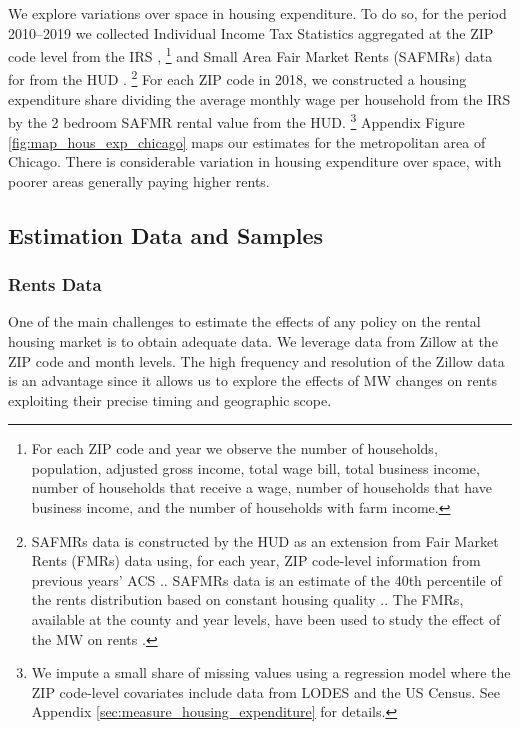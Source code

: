 We explore variations over space in housing expenditure.
To do so, for the period 2010--2019
we collected Individual Income Tax Statistics aggregated at the ZIP code level 
from the IRS \parencite{IRS},%
\footnote{For each ZIP code and year we observe the number of households, 
population, adjusted gross income, total wage bill, total business income, 
number of households that receive a wage, number of households that have 
business income, and the number of households with farm income.}
and Small Area Fair Market Rents (SAFMRs) data for from the HUD 
\parencite{hudSAFMR}.%
\footnote{SAFMRs data is constructed by the HUD as an extension from 
Fair Market Rents (FMRs) data using, for each year, ZIP code-level information
from previous years' ACS \parencite[][, p. 35]{SafmrReport2018}..
SAFMRs data is an estimate of the 40th percentile of the rents distribution
based on constant housing quality \parencite[][, p. 1]{SafmrReport2018}..
The FMRs, available at the county and year levels, have been used to study the 
effect of the MW on rents \parencite{Tidemann2018, Yamagishi2019}.}
For each ZIP code in 2018, we constructed a housing expenditure share dividing 
the average monthly wage per household from the IRS by the 2 bedroom SAFMR 
rental value from the HUD.%
\footnote{We impute a small share of missing values using a regression model 
where the ZIP code-level covariates include data from LODES and the US Census.
See Appendix \ref{sec:measure_housing_expenditure} for details.}
Appendix Figure \ref{fig:map_hous_exp_chicago} maps our estimates for the 
metropolitan area of Chicago.
There is considerable variation in housing expenditure over space, with poorer
areas generally paying higher rents.

\subsection{Estimation Data and Samples}

\subsubsection{Rents Data}
\label{sec:data_rents}

One of the main challenges to estimate the effects of any policy on the rental
housing market is to obtain adequate data.
We leverage data from Zillow at the ZIP code and month levels.
The high frequency and resolution of the Zillow data is an advantage since it 
allows us to explore the effects of MW changes on rents exploiting their precise
timing and geographic scope. 

